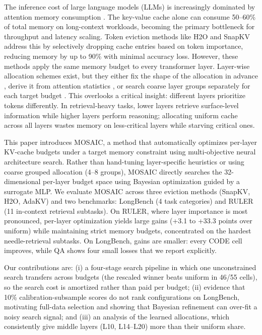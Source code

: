 \documentclass[11pt]{article}
\begin{document}
The inference cost of large language models (LLMs) is increasingly dominated by attention memory consumption \citep{dao2022flashattention}. The key-value cache alone can consume 50–60\% of total memory on long-context workloads, becoming the primary bottleneck for throughput and latency scaling. Token eviction methods like H2O \citep{zhang2023h2o} and SnapKV \citep{li2024snapkv} address this by selectively dropping cache entries based on token importance, reducing memory by up to 90\% with minimal accuracy loss. However, these methods apply the same memory budget to every transformer layer. Layer-wise allocation schemes exist, but they either fix the shape of the allocation in advance \citep{cai2024pyramidkv}, derive it from attention statistics \citep{qin2025cake}, or search coarse layer groups separately for each target budget \citep{yu2025evolkv}. This overlooks a critical insight: different layers prioritize tokens differently. In retrieval-heavy tasks, lower layers retrieve surface-level information while higher layers perform reasoning; allocating uniform cache across all layers wastes memory on less-critical layers while starving critical ones.

This paper introduces MOSAIC, a method that automatically optimizes per-layer KV-cache budgets under a target memory constraint using multi-objective neural architecture search. Rather than hand-tuning layer-specific heuristics or using coarse grouped allocation (4–8 groups), MOSAIC directly searches the 32-dimensional per-layer budget space using Bayesian optimization guided by a surrogate MLP. We evaluate MOSAIC across three eviction methods (SnapKV, H2O, AdaKV) and two benchmarks: LongBench (4 task categories) and RULER (11 in-context retrieval subtasks). On RULER, where layer importance is most pronounced, per-layer optimization yields large gains (+3.1 to +33.3 points over uniform) while maintaining strict memory budgets, concentrated on the hardest needle-retrieval subtasks. On LongBench, gains are smaller: every CODE cell improves, while QA shows four small losses that we report explicitly.

Our contributions are: (i) a four-stage search pipeline in which one unconstrained search transfers across budgets (the rescaled winner beats uniform in 46/55 cells), so the search cost is amortized rather than paid per budget; (ii) evidence that 10\% calibration-subsample scores do not rank configurations on LongBench, motivating full-data selection and showing that Bayesian refinement can over-fit a noisy search signal; and (iii) an analysis of the learned allocations, which consistently give middle layers (L10, L14–L20) more than their uniform share.
\end{document}
